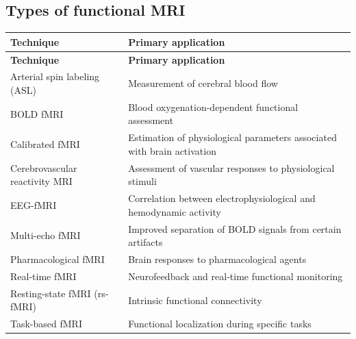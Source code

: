 \subsection{Types of functional MRI}
\begin{longtable}{@{}p{}p{}@{}}
\toprule
\textbf{Technique} & \textbf{Primary application} \\
\midrule
\endfirsthead
\toprule
\textbf{Technique} & \textbf{Primary application} \\
\midrule
\endhead
Arterial spin labeling (ASL) & Measurement of cerebral blood flow \\
BOLD fMRI & Blood oxygenation-dependent functional assessment \\
Calibrated fMRI & Estimation of physiological parameters associated with brain activation \\
Cerebrovascular reactivity MRI & Assessment of vascular responses to physiological stimuli \\
EEG-fMRI & Correlation between electrophysiological and hemodynamic activity \\
Multi-echo fMRI & Improved separation of BOLD signals from certain artifacts \\
Pharmacological fMRI & Brain responses to pharmacological agents \\
Real-time fMRI & Neurofeedback and real-time functional monitoring \\
Resting-state fMRI (rs-fMRI) & Intrinsic functional connectivity \\
Task-based fMRI & Functional localization during specific tasks \\
\bottomrule
\end{longtable}

